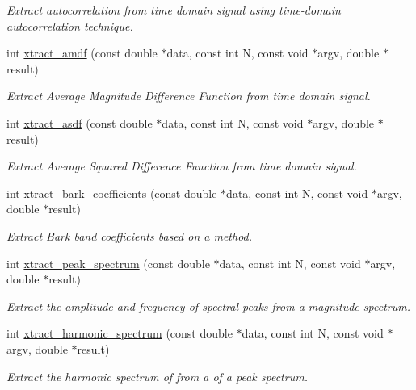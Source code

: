 \begin{DoxyCompactItemize}
\begin{DoxyCompactList}\small\item\em Extract autocorrelation from time domain signal using time-\/domain autocorrelation technique. \end{DoxyCompactList}\item 
int \hyperlink{group__vector_ga1b075e57823018b3866eb46353899a8a}{xtract\-\_\-amdf} (const double $\ast$data, const int N, const void $\ast$argv, double $\ast$result)
\begin{DoxyCompactList}\small\item\em Extract Average Magnitude Difference Function from time domain signal. \end{DoxyCompactList}\item 
int \hyperlink{group__vector_gae7488be2a95d9cf30618dfe8bafc1c28}{xtract\-\_\-asdf} (const double $\ast$data, const int N, const void $\ast$argv, double $\ast$result)
\begin{DoxyCompactList}\small\item\em Extract Average Squared Difference Function from time domain signal. \end{DoxyCompactList}\item 
int \hyperlink{group__vector_gaa768d5113f079ea26e6b3f95cb4137c2}{xtract\-\_\-bark\-\_\-coefficients} (const double $\ast$data, const int N, const void $\ast$argv, double $\ast$result)
\begin{DoxyCompactList}\small\item\em Extract Bark band coefficients based on a method. \end{DoxyCompactList}\item 
int \hyperlink{group__vector_gaa3757cab6c448a406ebb84ff9ae43c6f}{xtract\-\_\-peak\-\_\-spectrum} (const double $\ast$data, const int N, const void $\ast$argv, double $\ast$result)
\begin{DoxyCompactList}\small\item\em Extract the amplitude and frequency of spectral peaks from a magnitude spectrum. \end{DoxyCompactList}\item 
int \hyperlink{group__vector_gab2bd7f3943d0553d18b946c5e947ca73}{xtract\-\_\-harmonic\-\_\-spectrum} (const double $\ast$data, const int N, const void $\ast$argv, double $\ast$result)
\begin{DoxyCompactList}\small\item\em Extract the harmonic spectrum of from a of a peak spectrum. \end{DoxyCompactList}\item 

\end{DoxyCompactItemize}
